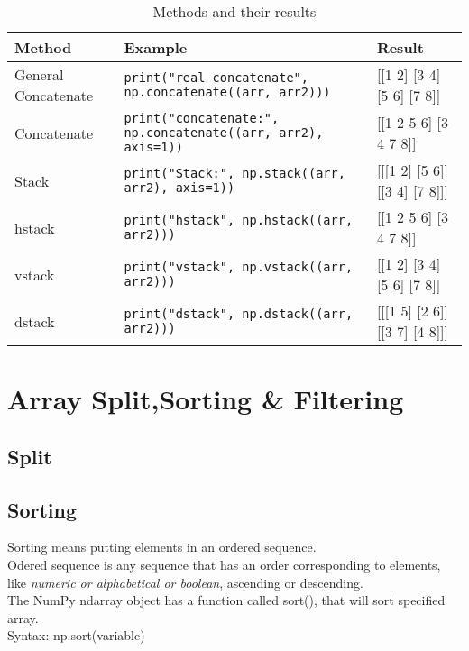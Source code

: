 \documentclass[openany]{book}
\begin{document}
\begin{table}[htbp]
    \centering
    \begin{tabular}{|p{2cm}|p{10cm}|p{4cm}|}
        \hline
        Method & Example & Result \\
        \hline
        General Concatenate & \texttt{print("real concatenate", np.concatenate((arr, arr2)))} & [[1 2] [3 4] [5 6] [7 8]] \\ \hline
        Concatenate & \texttt{print("concatenate:", np.concatenate((arr, arr2), axis=1))} & [[1 2 5 6] [3 4 7 8]] \\  \hline
        Stack & \texttt{print("Stack:", np.stack((arr, arr2), axis=1))} & [[[1 2] [5 6]] [[3 4] [7 8]]] \\ \hline
        hstack & \texttt{print("hstack", np.hstack((arr, arr2)))} & [[1 2 5 6] [3 4 7 8]] \\ \hline
        vstack & \texttt{print("vstack", np.vstack((arr, arr2)))} & [[1 2] [3 4] [5 6] [7 8]] \\ \hline
        dstack & \texttt{print("dstack", np.dstack((arr, arr2)))} & [[[1 5] [2 6]] [[3 7] [4 8]]] \\ \hline
        \hline
    \end{tabular}
    \caption{Methods and their results}
    \label{tab:methods_results}
\end{table}

\chapter{Array Split,Sorting \& Filtering}
\section{Split}


\section{Sorting}
Sorting means putting elements in an ordered sequence. \\
Odered sequence is any sequence that has an order corresponding to elements, like \textit{numeric or alphabetical or boolean}, ascending or descending. \\
The NumPy ndarray object has a function called sort(), that will sort specified array. \\

Syntax: np.sort(variable) \\
\end{document}
